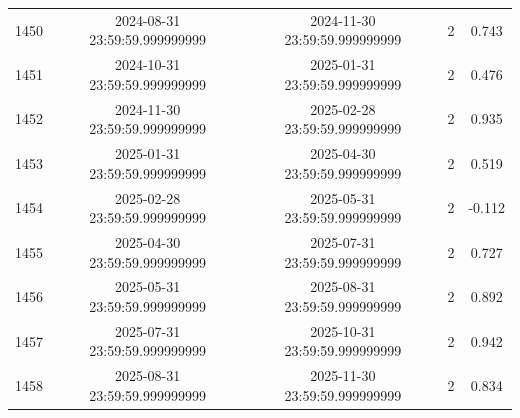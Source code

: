 \begin{table}
\begin{tabular}{lcccc}
1450 & 2024-08-31 23:59:59.999999999 & 2024-11-30 23:59:59.999999999 & 2 & 0.743 \\
1451 & 2024-10-31 23:59:59.999999999 & 2025-01-31 23:59:59.999999999 & 2 & 0.476 \\
1452 & 2024-11-30 23:59:59.999999999 & 2025-02-28 23:59:59.999999999 & 2 & 0.935 \\
1453 & 2025-01-31 23:59:59.999999999 & 2025-04-30 23:59:59.999999999 & 2 & 0.519 \\
1454 & 2025-02-28 23:59:59.999999999 & 2025-05-31 23:59:59.999999999 & 2 & -0.112 \\
1455 & 2025-04-30 23:59:59.999999999 & 2025-07-31 23:59:59.999999999 & 2 & 0.727 \\
1456 & 2025-05-31 23:59:59.999999999 & 2025-08-31 23:59:59.999999999 & 2 & 0.892 \\
1457 & 2025-07-31 23:59:59.999999999 & 2025-10-31 23:59:59.999999999 & 2 & 0.942 \\
1458 & 2025-08-31 23:59:59.999999999 & 2025-11-30 23:59:59.999999999 & 2 & 0.834 \\
\bottomrule
\end{tabular}
\end{table}
